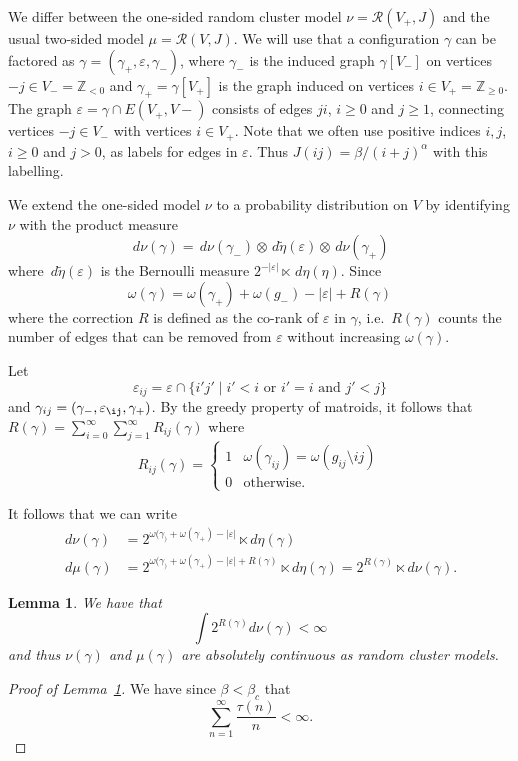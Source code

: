 \documentclass[11pt, a4paper, oneside]{article}
\newtheorem{lemma}[thm]{Lemma}
\theoremstyle{definition}
\theoremstyle{remark}
\renewcommand{\d}{\,d}
\providecommand{\ZZ}{\mathbb{Z}}
\providecommand{\mscr}{\mathscr}
\providecommand{\e}{\epsilon}
\providecommand{\tl}{\tilde}
\providecommand{\g}{\gamma}
\providecommand{\w}{\omega}
\def\e{\varepsilon}
\begin{document}
We differ between the one-sided random cluster model $\nu = \mscr R(V_+,J)$ and
the usual two-sided model $\mu = \mscr R(V,J)$. We will use that a configuration
$\g$ can be factored as $\g = (\g_+, \e, \g_-)$, where $\g_-$ is the induced
graph $\g[V_-]$ on vertices $-j\in V_-=\ZZ_{<0}$ and $\g_+=\g[V_+]$ is the graph
induced on vertices $i\in V_+=\ZZ_{\ge0}$. The graph $\e=\g\cap E(V_+,V-)$
consists of edges $ji$, $i\ge0$ and $j\ge 1$, connecting vertices $-j\in V_-$
with vertices $i\in V_+$. Note that we often use positive indices $i,j$, $i\ge0$
and $j>0$, as labels for edges in $\e$. Thus $J(ij)=\beta/(i+j)^\alpha$ with
this labelling.

We extend the one-sided model $\nu$ to a probability distribution on $V$ by
identifying $\nu$ with the product measure
$$
\d\nu(\g) = \d\nu(\gamma_-) \otimes \d\tl\eta(\e) \otimes \d\nu(\g_+)
$$
where $\d\tl\eta(\e)$ is the Bernoulli measure $2^{-|\e|}\ltimes \d\eta(\eta)$.
Since
$$
\w(\g) = \w(\g_+) + \w(g_-) - |\e| + R(\g)
$$
where the correction $R$ is defined as the co-rank of $\e$ in $\g$, i.e.\
$R(\g)$ counts the number of edges that can be removed from $\e$ without
increasing $\w(\g)$.

Let
$$\e_{ij} = \e \cap \{i'j' \mid i' < i \text{ or } i' = i \text{ and } j' < j\} $$
and $\g_{ij}=(\g_-,\e_{\ij},\g_+)$. By the greedy property of matroids, it
follows that $R(\g) = \sum_{i=0}^\infty\sum_{j=1}^\infty R_{ij}(\g)$ where
$$ R_{ij}(\g) =
  \begin{cases}
    1 & \w(\g_{ij}) = \w(g_{ij}\setminus {ij}) \\
    0 & \text{otherwise.}
  \end{cases}
$$

It follows that we can write
\begin{align}
  \d\nu(\g) &= 2^{\w(\g_)+\w(\g_+) - |\e|} \ltimes d\eta(\g) \\
  \d\mu(\g) &= 2^{\w(\g_)+\w(\g_+) - |\e|+R(\g)} \ltimes d\eta(\g)
              = 2^{R(\g)} \ltimes d\nu(\g).
\end{align}

\begin{lemma}\label{lem:RL1}
  We have that
  \[
    \int 2^{R(\g)} d\nu(\g) < \infty
  \]
  and thus $\nu(\g)$ and $\mu(\g)$ are absolutely continuous as random cluster
  models.
\end{lemma}
\begin{proof}[Proof of Lemma~\ref{lem:RL1}]

  We have since $\beta<\beta_c$ that
  \[
    \sum_{n=1}^{\infty} \frac{\tau(n)}{n} < \infty.
  \]

\end{proof}
\end{document}
